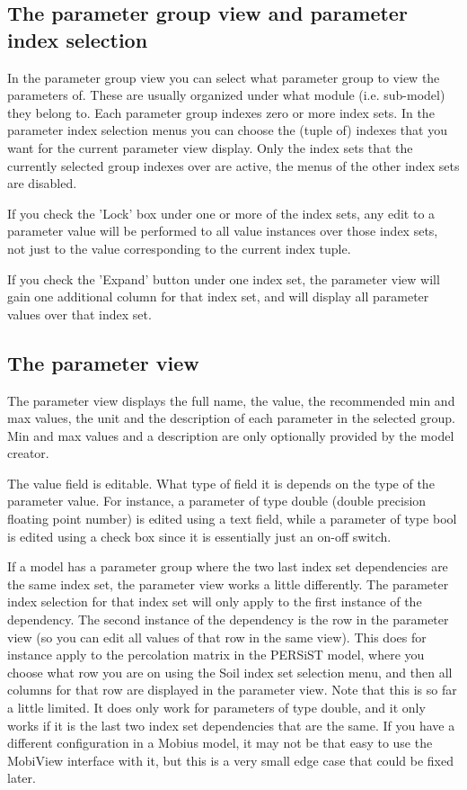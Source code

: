 \documentclass[11pt]{article}
\theoremstyle{definition}
\begin{document}
\subsection{The parameter group view and parameter index selection}

In the parameter group view you can select what parameter group to view the parameters of. These are usually organized under what module (i.e. sub-model) they belong to. Each parameter group indexes zero or more index sets. In the parameter index selection menus you can choose the (tuple of) indexes that you want for the current parameter view display. Only the index sets that the currently selected group indexes over are active, the menus of the other index sets are disabled.

If you check the 'Lock' box under one or more of the index sets, any edit to a parameter value will be performed to all value instances over those index sets, not just to the value corresponding to the current index tuple.

If you check the 'Expand' button under one index set, the parameter view will gain one additional column for that index set, and will display all parameter values over that index set.

\subsection{The parameter view}

The parameter view displays the full name, the value, the recommended min and max values, the unit and the description of each parameter in the selected group. Min and max values and a description are only optionally provided by the model creator.

The value field is editable. What type of field it is depends on the type of the parameter value. For instance, a parameter of type double (double precision floating point number) is edited using a text field, while a parameter of type bool is edited using a check box since it is essentially just an on-off switch.

If a model has a parameter group where the two last index set dependencies are the same index set, the parameter view works a little differently. The parameter index selection for that index set will only apply to the first instance of the dependency. The second instance of the dependency is the row in the parameter view (so you can edit all values of that row in the same view). This does for instance apply to the percolation matrix in the PERSiST model, where you choose what row you are on using the Soil index set selection menu, and then all columns for that row are displayed in the parameter view. Note that this is so far a little limited. It does only work for parameters of type double, and it only works if it is the last two index set dependencies that are the same. If you have a different configuration in a Mobius model, it may not be that easy to use the MobiView interface with it, but this is a very small edge case that could be fixed later.
\end{document}

